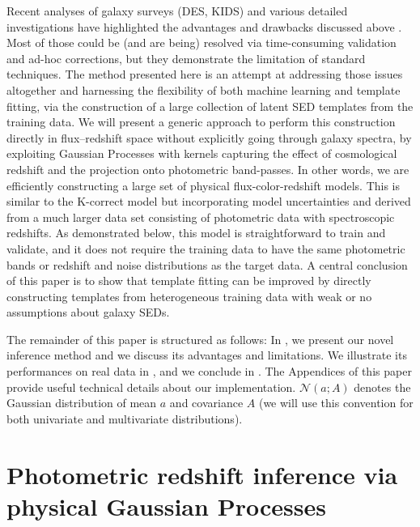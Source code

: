 \documentclass[aps,prd,showpacs,superscriptaddress,groupedaddress]{revtex4}  %
\begin{document}
Recent analyses of galaxy surveys (DES, KIDS) and various detailed \photoz investigations have highlighted the advantages and drawbacks discussed above \citep[see \eg][]{Newman:2013cac, Dahlen:2013fea, Sanchez:2014zgq, Schmidt:2014ela, Bonnett:2015pww}. 
Most of those could be (and are being) resolved via time-consuming validation and ad-hoc corrections, but they demonstrate the limitation of standard \photoz techniques.
The method presented here is an attempt at addressing those issues altogether and harnessing the flexibility of both machine learning and template fitting, via the construction of a large collection of latent SED templates from the training data.
We will present a generic approach to perform this construction directly in flux--redshift space without explicitly going through galaxy spectra, by exploiting Gaussian Processes with kernels capturing the effect of cosmological redshift and the projection onto photometric band-passes.
In other words, we are efficiently constructing a large set of physical flux-color-redshift models.
This is similar to the K-correct model \citep{Blanton:2007} but incorporating model uncertainties and derived from a much larger data set consisting of photometric data with spectroscopic redshifts.
As demonstrated below, this model is straightforward to train and validate, and it does not require the training data to have the same photometric bands or redshift and noise distributions as the target data.
A central conclusion of this paper is to show that template fitting can be improved by directly constructing templates from heterogeneous training data with weak or no assumptions about galaxy SEDs.


The remainder of this paper is structured as follows: In , we present our novel \photoz inference method and we discuss its advantages and limitations. We illustrate its performances on real data in , and we conclude in . The Appendices of this paper provide useful technical details about our implementation. $\mathcal{N}(a;A)$ denotes the Gaussian distribution of mean $a$ and covariance $A$ (we will use this convention for both univariate and multivariate distributions).


\section{Photometric redshift inference via physical Gaussian Processes}\label{sec:methods}
\end{document}

